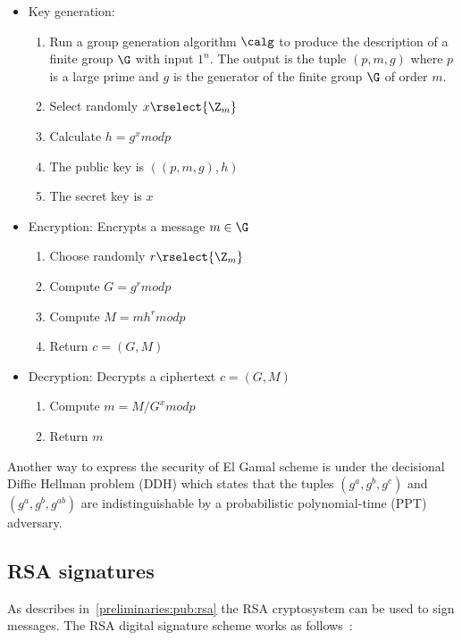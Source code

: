 \begin{itemize}
  \item Key generation:
    \begin{enumerate}
        \item Run a group generation algorithm $\calg$ to produce the description of a finite group $\G$ with input $1^{n}$. The output is the tuple $(p, m, g)$ where $p$ is a large prime and $g$ is the generator of the finite group $\G$ of order $m$.
        \item Select randomly $x \rselect{\Z_m}$
        \item Calculate $h = g^{x}modp$
        \item The public key is $((p, m, g), h)$
        \item The secret key is $x$
    \end{enumerate}
  \item Encryption: Encrypts a message $m \in \G$
    \begin{enumerate}
      \item Choose randomly $r \rselect{\Z_m}$
      \item Compute $G = g^{r}modp$
      \item Compute $M = mh^{r}modp$
      \item Return $c = (G, M)$
    \end{enumerate}
  \item Decryption: Decrypts a ciphertext $c = (G, M)$
    \begin{enumerate}
      \item Compute $m = M / G^{x} modp$
      \item Return $m$
    \end{enumerate}
\end{itemize}

Another way to express the security of El Gamal scheme is under the decisional Diffie Hellman problem (DDH) which states that the tuples $(g^a, g^b, g^c)$ and $(g^a, g^b, g^{ab})$ are indistinguishable by a probabilistic polynomial-time (PPT) adversary.

\subsection{RSA signatures}
\label{preliminaries:sign:rsa}

As describes in~\ref{preliminaries:pub:rsa} the RSA cryptosystem can be used to sign messages. The RSA digital signature scheme works as follows~\cite{Katz:2014:IMC:2700550, kiagias:crypto}:

